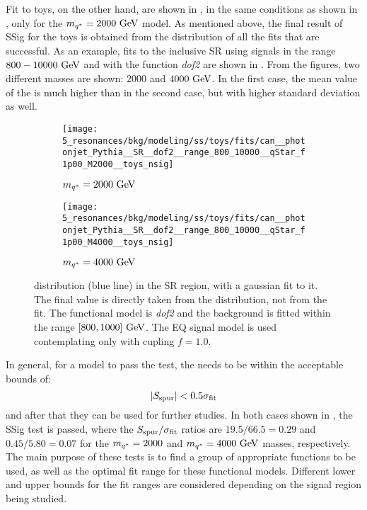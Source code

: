 Fit to toys, on the other hand, are shown in \Fig{\ref{fig:bkg:modeling:sigbkg:sstest:sstest_toys_examples}}, in the same conditions as shown in \Fig{\ref{fig:bkg:modeling:sigbkg:sstest:sstest_asimov_examples}}, only for the \(m_{q^{*}}=2000~\text{GeV}\) model. As mentioned above, the final result of \ac{SSig} for the toys is obtained from the \sspur distribution of all the fits that are successful. As an example, fits to the inclusive SR using \qstar signals in the range \(800-10000~\text{GeV}\) and with the function \textit{dof2} are shown in \Fig{\ref{fig:bkg_modeling:sstest_toys_distributions}}. From the figures, two different \qstar masses are shown: \(2000\) and \(4000~\text{GeV}\). In the first case, the mean value of the \sspur is much higher than in the second case, but with higher standard deviation as well.
\begin{figure}[ht!]
    \centering
    \begin{subfigure}[h]{0.49\linewidth}
        \centering
        \texttt{[image: 5\_resonances/bkg/modeling/ss/toys/fits/can\_\_photonjet\_Pythia\_\_SR\_\_dof2\_\_range\_800\_10000\_\_qStar\_f1p00\_M2000\_\_toys\_nsig]}
        \caption{\(m_{q^*} = 2000~\text{GeV}\)}
    \end{subfigure}
    \hfill
    \begin{subfigure}[h]{0.49\linewidth}
        \centering
        \texttt{[image: 5\_resonances/bkg/modeling/ss/toys/fits/can\_\_photonjet\_Pythia\_\_SR\_\_dof2\_\_range\_800\_10000\_\_qStar\_f1p00\_M4000\_\_toys\_nsig]}
        \caption{\(m_{q^*} = 4000~\text{GeV}\)}
    \end{subfigure}
    \caption{\sspur distribution (blue line) in the SR region, with a gaussian fit to it. The final \sspur value is directly taken from the distribution, not from the fit. The functional model is \textit{dof2} and the background is fitted within the range \([800, 1000]~\text{GeV}\). The \ac{EQ} signal model is used contemplating only \qstar with cupling \(f=1.0\).}
    \label{fig:bkg_modeling:sstest_toys_distributions}
\end{figure}


In general, for a model to pass the test, the \sspur needs to be within the acceptable bounds of:
\begin{equation*}
    |S_{\text{spur}}| < 0.5 \sigma_{\text{fit}}
\end{equation*}
and after that they can be used for further studies. In both cases shown in \Fig{\ref{fig:bkg_modeling:sstest_toys_distributions}}, the \ac{SSig} test is passed, where the \(S_{\text{spur}} / \sigma_{\text{fit}}\) ratios are \(19.5 / 66.5 = 0.29\) and \(0.45 / 5.80 = 0.07\) for the \(m_{q^*} = 2000\) and \(m_{q^*} = 4000~\text{GeV}\) masses, respectively.
The main purpose of these tests is to find a group of appropriate functions to be used, as well as the optimal fit range for these functional models. Different lower and upper bounds for the fit ranges are considered depending on the signal region being studied.


